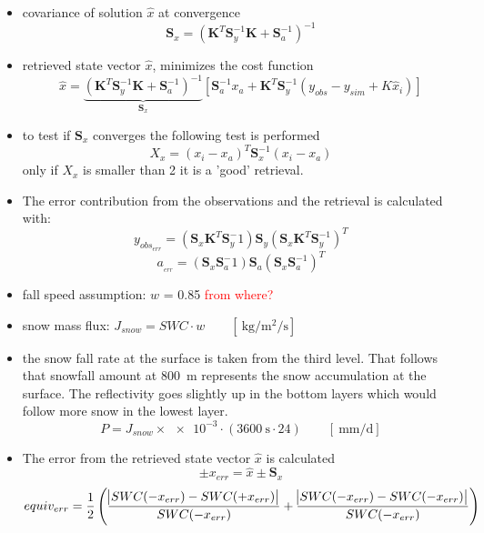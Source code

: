 \begin{itemize}
	\item covariance of solution $\hat{x}$ at convergence
	$$\mathbf{S}_x = \left( \mathbf{K}^T \mathbf{S}_y^{-1} \mathbf{K} + \mathbf{S}_a^{-1} \right)^{-1}$$
	\item retrieved state vector $\hat{x}$, minimizes the cost function
	$$\hat{x} = \underbrace{\left( \mathbf{K}^T \mathbf{S}_y^{-1} \mathbf{K} + \mathbf{S}_a^{-1} \right)^{-1}}_\text{$\mathbf{S}_x$}
	\left[ \mathbf{S}_a^{-1} x_a + \mathbf{K}^T \mathbf{S}_y^{-1} (y_{obs} - y_{sim} + K \hat{x}_i)  \right] $$
	\item to test if $\mathbf{S}_x$ converges the following test is performed 
	$$X_x = \left( x_i - x_a \right)^T \mathbf{S}_x^{-1} \left( x_i-x_a \right)$$ only if $X_x$ is smaller than 2 it is a 'good' retrieval. 
	\item The error contribution from the observations and the retrieval is calculated with: 
	$$y_{obs_{err}} = \left( \mathbf{S}_x \mathbf{K}^T \mathbf{S}_y^-1 \right) \mathbf{S}_y \left( \mathbf{S}_x \mathbf{K}^T \mathbf{S}_y^{-1} \right)^T$$
	$$a_{_{err}} = \left( \mathbf{S}_x \mathbf{S}_a^-1 \right) \mathbf{S}_a \left( \mathbf{S}_x \mathbf{S}_a^{-1} \right)^T $$
	\item fall speed assumption: $w$ = \SI{0.85}{\mPs} \textcolor{red}{from where?}
	\item snow mass flux: $J_{snow} = SWC \cdot w \qquad [\SI{}{\kilogram\per\square\metre\per\second}]$ 
	\item the snow fall rate at the surface is taken from the third level. That follows that snowfall amount at \SI{800}{\metre} represents the snow accumulation at the surface. The reflectivity goes slightly up in the bottom layers which would follow more snow in the lowest layer. 
	$$P = J_{snow} \times \num{e-3} \cdot \left(\SI{3600}{\second} \cdot24 \right) \qquad [\SI{}{\mm\per\day}]$$ 
	\item The error from the retrieved state vector $\hat{x}$ is calculated
	$$\pm x_{err} = \hat{x} \pm \mathbf{S}_x$$ 
	$$equiv_{err} = \frac{1}{2} \left( \frac{\abs{SWC(-x_{err}) - SWC(+x_{err}) }}{SWC(-x_{err})} + \frac{\abs{SWC(-x_{err}) - SWC(-x_{err}) }}{SWC(-x_{err})} \right)$$
\end{itemize}


